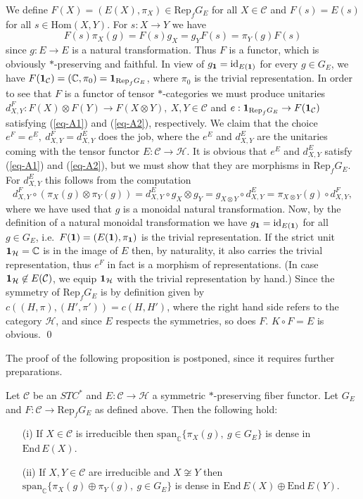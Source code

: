 \documentclass[12pt]{article}
\theoremstyle{definition}
\theoremstyle{definition}
\theoremstyle{remark}
\def\2#1{{\mathcal #1}}
\def\7#1{{\mathbb #1}}
\def\1#1{{\bf #1}}
\newcommand{\Hom}{\mathrm{Hom}}
\newcommand{\End}{\mathrm{End}}
\newcommand{\Rep}{\mathrm{Rep}}
\newcommand{\mcirc}{\circ}
\newcommand{\rarr}{\rightarrow}
\def\id{\mathrm{id}}
\begin{document}
\prf We define $F(X)=(E(X),\pi_X)\in\Rep_fG_E$ for all $X\in\2C$ and $F(s)=E(s)$ for all
$s\in\Hom(X,Y)$. For $s:X\rarr Y$ we have
\[ F(s) \pi_X(g)=F(s)g_X=g_YF(s)=\pi_Y(g)F(s) \]
since $g:E\rarr E$ is a natural transformation. Thus $F$ is a functor, which is obviously
$*$-preserving and faithful. In view of $g_\11=\id_{E(\11)}$ for every $g\in G_E$, we have
$F(\11_\2C)=(\7C,\pi_0)=\11_{\Rep_fG_E}$, where $\pi_0$ is the trivial representation. In order to
see that $F$ is a functor of tensor $*$-categories we must produce unitaries 
$d^F_{X,Y}: F(X)\otimes F(Y)\rarr F(X\otimes Y),\ X,Y\in\2C$ and 
$e:\11_{\Rep_fG_E}\rarr F(\11_\2C)$ satisfying (\ref{eq-A1}) and (\ref{eq-A2}), respectively.
We claim that the choice $e^F=e^E, \ d^F_{X,Y}=d^E_{X,Y}$ does the job, where the $e^E$ and
$d^E_{X,Y}$ are the unitaries coming with the tensor functor $E:\2C\rarr\2H$. It is obvious that  
$e^E$ and $d^E_{X,Y}$ satisfy (\ref{eq-A1}) and (\ref{eq-A2}), but we must show that they are
morphisms in $\Rep_fG_E$. For $d^E_{X,Y}$ this follows from the computation
\[ d^F_{X,Y}\mcirc (\pi_X(g)\otimes\pi_Y(g))=d^E_{X,Y}\mcirc g_X\otimes g_Y
   =g_{X\otimes Y}\mcirc d^E_{X,Y}=\pi_{X\otimes Y}(g)\mcirc d^F_{X,Y}, \]
where we have used that $g$ is a monoidal natural transformation. Now, by the definition of a
natural monoidal transformation we have $g_\11=\id_{E(\11)}$ for all $g\in G_E$, i.e.\
$F(\11)=(E(\11),\pi_\11)$ is the trivial representation. If the strict unit $\11_\2H=\7C$ is in the
image of $E$ then, by naturality, it also carries the trivial representation, thus $e^F$ in fact is
a morphism of representations. (In case $\11_\2H\not\in E(\2C)$, we equip $\11_\2H$ with the trivial
representation by hand.) Since the symmetry of $\Rep_fG_E$ is by definition given by
$c((H,\pi),(H',\pi'))=c(H,H')$, where the right hand side refers to the category $\2H$, and since
$E$ respects the symmetries, so does $F$. $K\circ F=E$ is obvious.
\qed

The proof of the following proposition is postponed, since it requires further preparations.

\bprop \label{prop-dense}
Let $\2C$ be an $STC^*$ and $E:\2C\rarr\2H$ a symmetric $*$-preserving fiber functor. Let $G_E$ and 
$F:\2C\rarr\Rep_fG_E$ as defined above. Then the following hold:
\begin{itemize}
\item[(i)] If $X\in\2C$ is irreducible then $\mathrm{span}_\7C\{ \pi_X(g),\ g\in G_E\}$ is dense in
  $\End\,E(X)$. 
\item[(ii)] If $X,Y\in\2C$ are irreducible and $X\not\cong Y$ then 
$\mathrm{span}_\7C\{ \pi_X(g)\oplus\pi_Y(g),\ g\in G_E\}$ is dense in $\End\,E(X)\oplus\End\,E(Y)$.
\end{itemize}
\eprop
\end{document}
